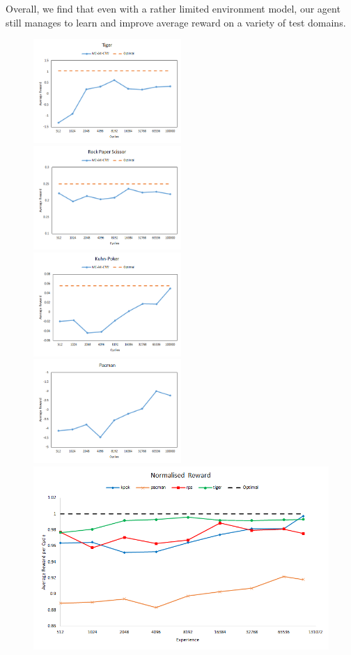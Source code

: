 \documentclass[paper=a4, fontsize=11pt]{scrartcl} %
\numberwithin{equation}{section} %
\numberwithin{figure}{section} %
\numberwithin{table}{section} %
\begin{document}
Overall, we find that even with a rather limited environment model, our agent still manages to learn and improve average reward on a variety of test domains.

\begin{figure}
\includegraphics[width=0.5\textwidth]{plots/tiger}
\includegraphics[width=0.5\textwidth]{plots/rps}
\includegraphics[width=0.5\textwidth]{plots/kpok}
\includegraphics[width=0.5\textwidth]{plots/pacman}
\includegraphics[width=\textwidth]{plots/normalised}

\end{figure}
\end{document}
